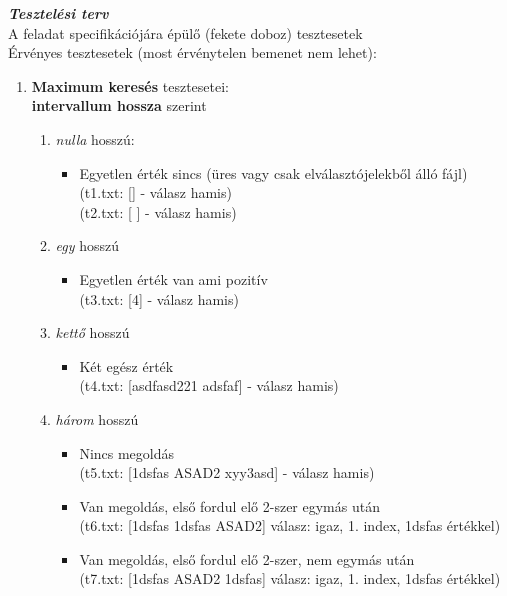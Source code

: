 \documentclass[12pt,a4paper]{article}			%
\newcommand{\fejezet}[1]{\noindent \textbf{\textit{\large #1 \vspace{5mm}}}}
\begin{document}
	\fejezet{Tesztelési terv}\\
		\renewcommand{\labelenumi}{\Alph{enumi}.}
		\renewcommand{\labelenumii}{\arabic{enumii}.}
		{\large A feladat specifikációjára épülő (fekete doboz) tesztesetek} \vspace{2mm}\\
		Érvényes tesztesetek (most érvénytelen bemenet nem lehet):
		\begin{enumerate}		
			\item \textbf{Maximum keresés} tesztesetei:\\
			\textbf{intervallum hossza} szerint
			\begin{enumerate}
				\item \textit{nulla} hosszú: 
				\begin{itemize}[label={}]
					\item Egyetlen érték sincs (üres vagy csak elválasztójelekből álló fájl)\\
					(t1.txt: [] - válasz hamis)\\
					(t2.txt: [    ] - válasz hamis)
				\end{itemize}
				\item \textit{egy} hosszú
				\begin{itemize}[label={}]
					\item Egyetlen érték van ami pozitív\\
					(t3.txt: [4] - válasz hamis)
				\end{itemize}
				\item \textit{kettő} hosszú
				\begin{itemize}[label={}]
					\item Két egész érték\\
					(t4.txt: [asdfasd221 adsfaf] - válasz hamis)
				\end{itemize}
				\item \textit{három} hosszú
				\begin{itemize}[label={}]
					\item Nincs megoldás\\
					(t5.txt: [1dsfas ASAD2 xyy3asd] - válasz hamis)
					\item Van megoldás, első fordul elő 2-szer egymás után\\
					(t6.txt: [1dsfas 1dsfas ASAD2] válasz: igaz, 1. index, 1dsfas értékkel)
					\item Van megoldás, első fordul elő 2-szer, nem egymás után\\
					(t7.txt: [1dsfas ASAD2 1dsfas] válasz: igaz, 1. index, 1dsfas értékkel)

\end{itemize}
\end{enumerate}
\end{enumerate}
\end{document}
